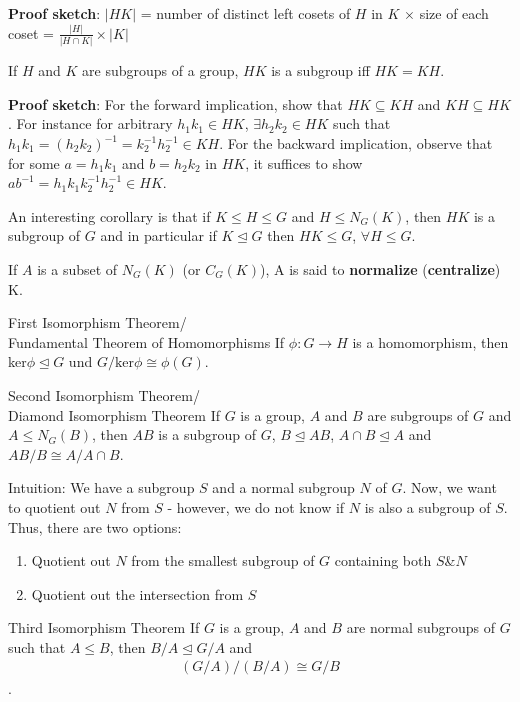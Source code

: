 \documentclass[titlepage, 12pt]{article}
\begin{document}
\textbf{Proof sketch}: $|HK|$ = number of distinct left cosets of $H$ in $K$
$\times$ size of each coset = $\frac{|H|}{|H\cap K|}\times |K|$
\begin{proposition}{}{}
    If $H$ and $K$ are subgroups of a group, $HK$ is a subgroup iff $HK = KH$.
\end{proposition}
\textbf{Proof sketch}:  For the forward implication, show that $HK\subseteq KH$
and $KH\subseteq HK$. For instance for arbitrary $h_1k_1\in HK$, $\exists
h_2k_2\in HK$ such that $h_1k_1 = (h_2k_2)^{-1} = k_2^{-1}h_2^{-1}\in KH$. For
the backward implication, observe that for some $a = h_1k_1$ and $b = h_2k_2$ in
$HK$, it suffices to show $ab^{-1} = h_1k_1k_2^{-1}h_2^{-1}\in HK$.

An interesting corollary is that if $ K \le H \le G$ and
$H\le N_G(K)$, then $HK$ is a subgroup of $G$ and in particular if
$K\trianglelefteq G$ then $HK\le G$, $\forall H\le G$.
\begin{definition}{}{}
    If $A$ is a subset of $N_G(K)$ (or $C_G(K)$), A is said to
    \textbf{normalize} (\textbf{centralize}) K.
\end{definition}
\begin{theorem}{First Isomorphism Theorem/\\Fundamental Theorem of Homomorphisms}{}
    If $\phi:G\rightarrow H$ is a homomorphism, then ker$\phi\trianglelefteq G$
    und $G/\text{ker}\phi\cong \phi(G)$.
\end{theorem}
\begin{theorem}{Second Isomorphism Theorem/\\Diamond Isomorphism Theorem}{}
    If $G$ is a group, $A$ and $B$ are subgroups of $G$ and $A\le N_G(B)$, then
    $AB$ is a subgroup of $G$, $B\trianglelefteq AB$, $A\cap B\trianglelefteq A$
    and $AB/B\cong A/A\cap B$.
\end{theorem}
Intuition: We have a subgroup $S$ and a normal subgroup $N$ of $G$. Now, we want
to quotient out $N$ from $S$ - however, we do not know if $N$ is also a subgroup
of $S$. Thus, there are two options:
\begin{enumerate}
    \item Quotient out $N$ from the smallest subgroup of $G$ containing both
        $S$\&$N$
    \item Quotient out the intersection from $S$
\end{enumerate}
\begin{theorem}{Third Isomorphism Theorem}{}
    If $G$ is a group, $A$ and $B$ are normal subgroups of $G$ such that $A\le
    B$, then $B/A\trianglelefteq G/A$ and 
    \begin{align*}
        (G/A)/(B/A) \cong G/B
    \end{align*}.
\end{theorem}
\end{document}
